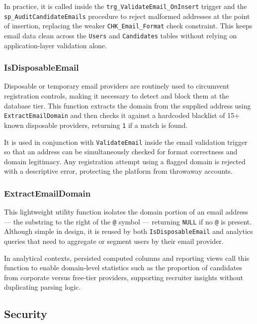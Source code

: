 \documentclass[11pt,a4paper]{article}
\begin{document}
In practice, it is called inside the \texttt{trg\_ValidateEmail\_OnInsert} trigger and the \texttt{sp\_AuditCandidateEmails} procedure to reject malformed addresses at the point of insertion, replacing the weaker \texttt{CHK\_Email\_Format} check constraint. This keeps email data clean across the \texttt{Users} and \texttt{Candidates} tables without relying on application-layer validation alone.

\subsubsection{IsDisposableEmail}
\noindent
Disposable or temporary email providers are routinely used to circumvent registration controls, making it necessary to detect and block them at the database tier. This function extracts the domain from the supplied address using \texttt{ExtractEmailDomain} and then checks it against a hardcoded blacklist of 15+ known disposable providers, returning \texttt{1} if a match is found.

It is used in conjunction with \texttt{ValidateEmail} inside the email validation trigger so that an address can be simultaneously checked for format correctness and domain legitimacy. Any registration attempt using a flagged domain is rejected with a descriptive error, protecting the platform from throwaway accounts.

\subsubsection{ExtractEmailDomain}
\noindent
This lightweight utility function isolates the domain portion of an email address --- the substring to the right of the \texttt{@} symbol --- returning \texttt{NULL} if no \texttt{@} is present. Although simple in design, it is reused by both \texttt{IsDisposableEmail} and analytics queries that need to aggregate or segment users by their email provider.

In analytical contexts, persisted computed columns and reporting views call this function to enable domain-level statistics such as the proportion of candidates from corporate versus free-tier providers, supporting recruiter insights without duplicating parsing logic.

\subsection{Security}
\end{document}
